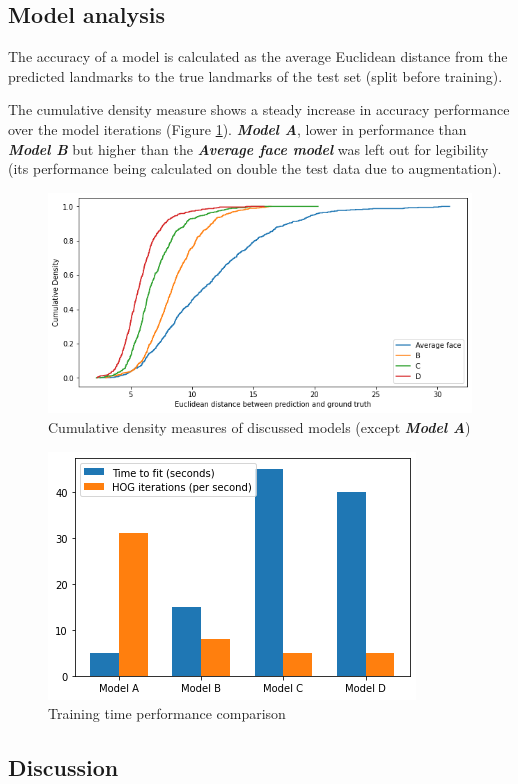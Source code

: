 \documentclass{article}
\begin{document}
\subsection{Model analysis}
The accuracy of a model is calculated as the average Euclidean distance from the predicted landmarks to the true landmarks of the test set (split before training).

The cumulative density measure shows a steady increase in accuracy performance over the model iterations (Figure \ref{fig:avgBCD}). \textbf{\textit{Model A}}, lower in performance than \textbf{\textit{Model B}} but higher than the \textbf{\textit{Average face model}} was left out for legibility (its performance being calculated on double the test data due to augmentation).

\begin{figure}[h]
  \centering
  \includegraphics[width=.8\textwidth]{avgBCD}
  \caption{Cumulative density measures of discussed models (except \textbf{\textit{Model A}})}
  \label{fig:avgBCD}
\end{figure}

\begin{figure}[h]
  \centering
  \includegraphics[width=.5\textwidth]{ABCD}
  \caption{Training time performance comparison}
  \label{fig:ABCD}
\end{figure}

\subsection{Discussion}
\end{document}
